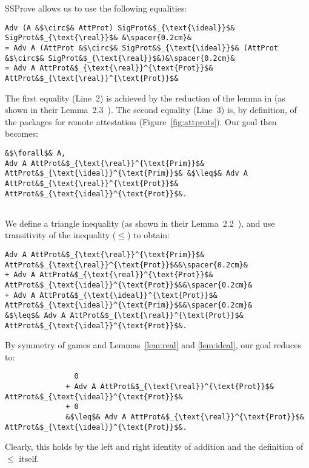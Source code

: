 \begin{IEEEproof}
    SSProve allows us to use the following equalities:
    \begin{center}
    \begin{minipage}{0.9\columnwidth}
    \begin{verbatim}
Adv (A &$\circ$& AttProt) SigProt&$_{\text{\ideal}}$& SigProt&$_{\text{\real}}$& &\spacer{0.2cm}&
= Adv A (AttProt &$\circ$& SigProt&$_{\text{\ideal}}$& (AttProt &$\circ$& SigProt&$_{\text{\real}}$&)&\spacer{0.2cm}&
= Adv A AttProt&$_{\text{\real}}^{\text{Prot}}$& AttProt&$_{\text{\real}}^{\text{Prot}}$&
    \end{verbatim}
    \end{minipage}
    \end{center}
    The first equality (Line~2) is achieved by the reduction of the lemma in \ssprove
    (as shown in their Lemma~2.3~\cite{ssprove}).
    The second equality (Line~3) is, by definition, of the 
    packages for remote attestation (Figure~\ref{fig:attprots}).
    Our goal then becomes:
    \begin{verbatim}
&$\forall$& A, 
Adv A AttProt&$_{\text{\real}}^{\text{Prim}}$& AttProt&$_{\text{\ideal}}^{\text{Prim}}$& &$\leq$& Adv A AttProt&$_{\text{\real}}^{\text{Prot}}$& AttProt&$_{\text{\ideal}}^{\text{Prot}}$&.
    
    \end{verbatim}
    We define a triangle inequality
    (as shown in their Lemma~2.2~\cite{ssprove}), and use transitivity of the 
    inequality ($\leq$) to obtain:
    \begin{verbatim}
Adv A AttProt&$_{\text{\real}}^{\text{Prim}}$& AttProt&$_{\text{\real}}^{\text{Prot}}$&&\spacer{0.2cm}&
+ Adv A AttProt&$_{\text{\real}}^{\text{Prot}}$& AttProt&$_{\text{\ideal}}^{\text{Prot}}$&&\spacer{0.2cm}&
+ Adv A AttProt&$_{\text{\ideal}}^{\text{Prot}}$& AttProt&$_{\text{\ideal}}^{\text{Prim}}$&&\spacer{0.2cm}&
&$\leq$& Adv A AttProt&$_{\text{\real}}^{\text{Prot}}$& AttProt&$_{\text{\ideal}}^{\text{Prot}}$&.
    \end{verbatim}
    By symmetry of games and Lemmas~\ref{lem:real} 
    and \ref{lem:ideal}, our goal reduces to:
    \begin{verbatim}
                0
              + Adv A AttProt&$_{\text{\real}}^{\text{Prot}}$& AttProt&$_{\text{\ideal}}^{\text{Prot}}$&
              + 0
              &$\leq$& Adv A AttProt&$_{\text{\real}}^{\text{Prot}}$& AttProt&$_{\text{\ideal}}^{\text{Prot}}$&.
  \end{verbatim}
  Clearly, this holds by the
  left and right identity of addition and
  the definition of $\leq$ itself.
\end{IEEEproof}
